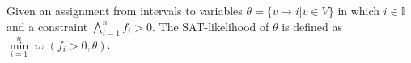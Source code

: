 \begin{definition}
Given an assignment from intervals to variables ${\theta = \{v \mapsto i | v \in V\}}$ in which $i \in \mathbb{I}$ and a constraint $\bigwedge\limits_{i = 1}^nf_i > 0$. The SAT-likelihood of $\theta$ is defined as ${\min\limits_{i = 1}^n \varpi(f_i > 0, \theta)}$.
\end{definition}